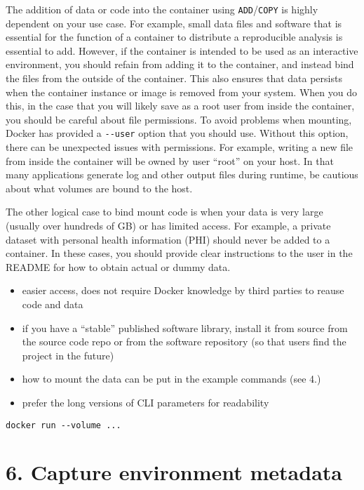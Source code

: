 \documentclass[10pt,letterpaper]{article}
\providecommand{\tightlist}{%
  \setlength{\itemsep}{0pt}\setlength{\parskip}{0pt}}
\begin{document}
The addition of data or code into the container using
\texttt{ADD}/\texttt{COPY} is highly dependent on your use case. For
example, small data files and software that is essential for the
function of a container to distribute a reproducible analysis is
essential to add. However, if the container is intended to be used as an
interactive environment, you should refain from adding it to the
container, and instead bind the files from the outside of the container.
This also ensures that data persists when the container instance or
image is removed from your system. When you do this, in the case that
you will likely save as a root user from inside the container, you
should be careful about file permissions. To avoid problems when
mounting, Docker has provided a \texttt{-\/-user} option that you should
use. Without this option, there can be unexpected issues with
permissions. For example, writing a new file from inside the container
will be owned by user ``root'' on your host. In that many applications
generate log and other output files during runtime, be cautious about
what volumes are bound to the host.

The other logical case to bind mount code is when your data is very
large (usually over hundreds of GB) or has limited access. For example,
a private dataset with personal health information (PHI) should never be
added to a container. In these cases, you should provide clear
instructions to the user in the README for how to obtain actual or dummy
data.

\begin{itemize}
\tightlist
\item
  easier access, does not require Docker knowledge by third parties to
  reause code and data
\item
  if you have a ``stable'' published software library, install it from
  source from the source code repo or from the software repository (so
  that users find the project in the future)
\item
  how to mount the data can be put in the example commands (see 4.)
\item
  prefer the long versions of CLI parameters for readability
\end{itemize}

\begin{verbatim}
docker run --volume ...
\end{verbatim}

\hypertarget{capture-environment-metadata}{%
\section*{6. Capture environment
metadata}\label{capture-environment-metadata}}
\end{document}
